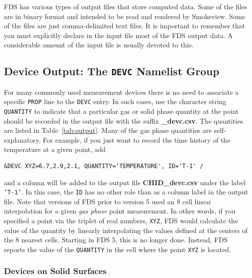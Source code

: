 \documentclass[11pt]{book}
\newcommand{\ct}{\tt\small}
\begin{document}
FDS has various types of output files that store computed data. Some of the files are in binary format and intended to be read and
rendered by Smokeview. Some of the files are just comma-delimited text files. It is important to remember that you must explicitly declare in
the input file most of the FDS output data. A considerable amount of the input file is usually devoted to this.


\subsection{Device Output: The \texorpdfstring{{\tt DEVC}}{DEVC} Namelist Group}


For many commonly used measurement devices there is no need to associate a
specific {\ct PROP} line to the {\ct DEVC} entry. In such cases, use the character string
{\ct QUANTITY} to indicate that a particular gas or solid phase quantity at the point should be recorded in
the output file with the suffix {\bf \_devc.csv}. The quantities are listed in Table~\ref{tab:output}.
Many of the gas phase quantities are self-explanatory. For example, if you just want to record the time history of the temperature at a given point, add

\footnotesize
\begin{verbatim}
&DEVC XYZ=6.7,2.9,2.1, QUANTITY='TEMPERATURE', ID='T-1' /
\end{verbatim}
\normalsize

\noindent
and a column will be added to the output file {\bf CHID\_devc.csv} under the label {\ct 'T-1'}. In this case, the {\ct ID} has no other role than as a column label in the output file.
Note that versions of FDS prior to version 5 used an 8 cell linear interpolation for a given {\em gas phase} point measurement. In other words, if you
specified a point via the triplet of real numbers, {\ct XYZ}, FDS would calculate the value of the quantity by linearly interpolating the
values defined at the centers of the 8 nearest cells. Starting in FDS 5, this is no longer done. Instead, FDS reports the value of the {\ct QUANTITY} in
the cell where the point {\ct XYZ} is located.

\subsubsection{Devices on Solid Surfaces}
\end{document}
